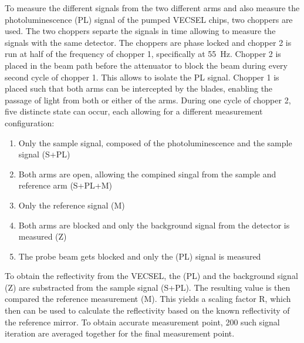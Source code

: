 To measure the different signals from the two different arms and also measure the photoluminescence (PL) signal of the pumped VECSEL chips, two choppers are used. The two choppers separte the signals in time allowing to measure the signals with the same detector. The choppers are phase locked and chopper 2 is run at half of the frequency of chopper 1, specifically at \qty{55}{\Hz}. Chopper 2 is placed in the beam path before the attenuator to block the beam during every second cycle of chopper 1. This allows to isolate the PL signal. Chopper 1 is placed such that both arms can be intercepted by the blades, enabling the passage of light from both or either of the arms. During one cycle of chopper 2, five distincte state can occur, each allowing for a different measurement configuration:
\begin{enumerate}
    \item Only the sample signal, composed of the photoluminescence and the sample signal (S+PL)
    \item Both arms are open, allowing the compined singal from the sample and reference arm  (S+PL+M)
    \item Only the reference signal (M)
    \item Both arms are blocked and only the background signal from the detector is measured (Z)
    \item The probe beam gets blocked and only the (PL) signal is measured
\end{enumerate}

To obtain the reflectivity from the VECSEL, the (PL) and the background signal (Z) are substracted from the sample signal (S+PL). The resulting value is then compared the reference measurement (M). This yields a scaling factor R, which then can be used to calculate the reflectivity based on the known reflectivity of the reference mirror. To obtain accurate measurement point, 200 such signal iteration are averaged together for the final measurement point.
\newpage

